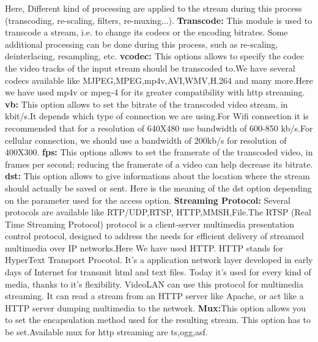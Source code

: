 \documentclass[12pt]{article}
\begin{document}
\begin{enumerate}
Here, Different kind of processing are applied to the stream during this process (transcoding, re-scaling, filters, re-muxing...).\newline\newline
{\bf \small Transcode: } This module is used to transcode a stream, i.e. to change its codecs or the encoding bitrates. Some additional processing can be done during this process, such as re-scaling, deinterlacing, resampling, etc.\newline\newline
{\bf {\small vcodec: }}This options allows to specify the codec the video tracks of the input stream should be transcoded to.We have several codecs available like MJPEG,MPEG,mp4v,AVI,WMV,H.264 and many more.Here we have used mp4v or mpeg-4 for its greater compatibility with http streaming.\newline\newline
{\bf \small vb: }This option allows to set the bitrate of the transcoded video stream, in kbit/s.It depends which type of connection we are using.For Wifi connection it is recommended that for a resolution of 640X480 use bandwidth of 600-850 kb/s.For cellular connection, we should use a bandwidth of 200kb/s for resolution of 400X300.\newline\newline
{\bf \small fps: }This options allows to set the framerate of the transcoded video, in frames per second; reducing the framerate of a video can help decrease its bitrate.\newline\newline
{\bf \small dst: }This option allows to give informations about the location where the stream should actually be saved or sent.\newline
Here is the meaning of the dst option depending on the parameter used for the access option.\newline\newline
{\bf \small Streaming Protocol: } Several protocols are available like RTP/UDP,RTSP,
\newline HTTP,MMSH,File.\newline The RTSP (Real Time Streaming Protocol) protocol is a client-server multimedia presentation control protocol, designed to address the needs for efficient delivery of streamed multimedia over IP networks.\newline Here We have used HTTP. HTTP stands for HyperText Transport Procotol. It's a application network layer developed in early days of Internet for transmit html and text files. Today it's used for every kind of media, thanks to it's flexibility. VideoLAN can use this protocol for multimedia streaming. It can read a stream from an HTTP server like Apache, or act like a HTTP server dumping multimedia to the network.\newline\newline
{\bf \small Mux:}This option allows you to set the encapsulation method used for the resulting stream. This option has to be set.Available mux for http streaming are ts,ogg,asf.\newline
\end{enumerate} 
\end{document}
